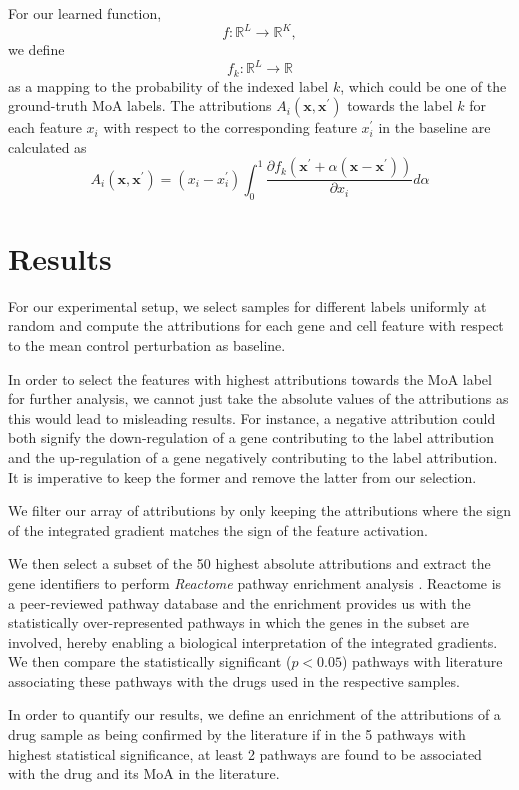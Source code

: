 \documentclass[bsc,frontabs,twoside,singlespacing,parskip,deptreport]{infthesis}     %
\let\Oldsection\section
\renewcommand{\section}{\FloatBarrier\Oldsection}
\begin{document}
For our learned function, \[f: \mathbb{R}^{L} \rightarrow \mathbb{R}^{K},\] we define \[f_{k}: \mathbb{R}^{L} \rightarrow \mathbb{R}\] as a mapping to the probability of the indexed label \(k\), which could be one of the ground-truth MoA labels. The attributions \(A_{i}\left(\mathbf{x}, \mathbf{x}^{\prime}\right)\) towards the label \(k\) for each feature \(x_{i}\) with respect to the corresponding feature \(x_{i}^{\prime}\) in the baseline are calculated as
\[ A_{i}\left(\mathbf{x}, \mathbf{x}^{\prime}\right)=\left(x_{i}-x_{i}^{\prime}\right) \int_{0}^{1} \frac{\partial f_{k}\left(\mathbf{x}^{\prime}+\alpha\left(\mathbf{x}-\mathbf{x}^{\prime}\right)\right)}{\partial x_{i}} d \alpha \]

\section{Results}
For our experimental setup, we select samples for different labels uniformly at random and compute the attributions for each gene and cell feature with respect to the mean control perturbation as baseline.

In order to select the features with highest attributions towards the MoA label for further analysis, we cannot just take the absolute values of the attributions as this would lead to misleading results. For instance, a negative attribution could both signify the down-regulation of a gene contributing to the label attribution and the up-regulation of a gene negatively contributing to the label attribution. It is imperative to keep the former and remove the latter from our selection.

We filter our array of attributions by only keeping the attributions where the sign of the integrated gradient matches the sign of the feature activation.

We then select a subset of the 50 highest absolute attributions and extract the gene identifiers to perform \textit{Reactome} pathway enrichment analysis \cite{fabregat_reactome_2017}. Reactome is a peer-reviewed pathway database and the enrichment provides us with the statistically over-represented pathways in which the genes in the subset are involved, hereby enabling a biological interpretation of the integrated gradients.
We then compare the statistically significant (\(p < 0.05\)) pathways with literature associating these pathways with the drugs used in the respective samples.

In order to quantify our results, we define an enrichment of the attributions of a drug sample as being confirmed by the literature if in the 5 pathways with highest statistical significance,  at least 2 pathways are found to be associated with the drug and its MoA in the literature.
\end{document}
